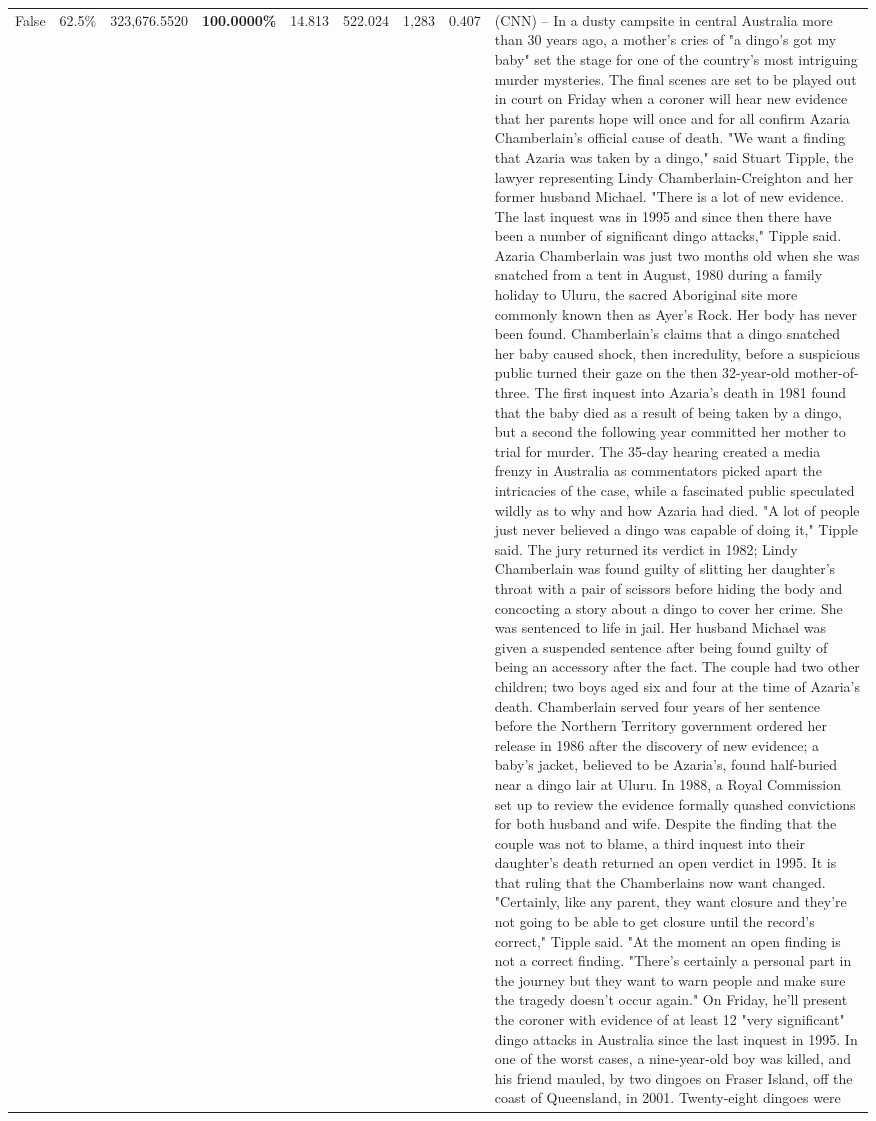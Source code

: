 \begin{table}[H]
\begin{tabular}{lllrlllll}
False & 62.5\% & 323,676.5520 & \bfseries \color{red} 100.0000\% & 14.813 & 522.024 & 1,283 & 0.407 & (CNN) -- In a dusty campsite in central Australia more than 30 years ago, a mother's cries of "a dingo's got my baby" set the stage for one of the country's most intriguing murder mysteries. The final scenes are set to be played out in court on Friday when a coroner will hear new evidence that her parents hope will once and for all confirm Azaria Chamberlain's official cause of death. "We want a finding that Azaria was taken by a dingo," said Stuart Tipple, the lawyer representing Lindy Chamberlain-Creighton and her former husband Michael. "There is a lot of new evidence. The last inquest was in 1995 and since then there have been a number of significant dingo attacks," Tipple said. Azaria Chamberlain was just two months old when she was snatched from a tent in August, 1980 during a family holiday to Uluru, the sacred Aboriginal site more commonly known then as Ayer's Rock. Her body has never been found. Chamberlain's claims that a dingo snatched her baby caused shock, then incredulity, before a suspicious public turned their gaze on the then 32-year-old mother-of-three. The first inquest into Azaria's death in 1981 found that the baby died as a result of being taken by a dingo, but a second the following year committed her mother to trial for murder. The 35-day hearing created a media frenzy in Australia as commentators picked apart the intricacies of the case, while a fascinated public speculated wildly as to why and how Azaria had died. "A lot of people just never believed a dingo was capable of doing it," Tipple said. The jury returned its verdict in 1982; Lindy Chamberlain was found guilty of slitting her daughter's throat with a pair of scissors before hiding the body and concocting a story about a dingo to cover her crime. She was sentenced to life in jail. Her husband Michael was given a suspended sentence after being found guilty of being an accessory after the fact. The couple had two other children; two boys aged six and four at the time of Azaria's death. Chamberlain served four years of her sentence before the Northern Territory government ordered her release in 1986 after the discovery of new evidence; a baby's jacket, believed to be Azaria's, found half-buried near a dingo lair at Uluru. In 1988, a Royal Commission set up to review the evidence formally quashed convictions for both husband and wife. Despite the finding that the couple was not to blame, a third inquest into their daughter's death returned an open verdict in 1995. It is that ruling that the Chamberlains now want changed. "Certainly, like any parent, they want closure and they're not going to be able to get closure until the record's correct," Tipple said. "At the moment an open finding is not a correct finding. "There's certainly a personal part in the journey but they want to warn people and make sure the tragedy doesn't occur again." On Friday, he'll present the coroner with evidence of at least 12 "very significant" dingo attacks in Australia since the last inquest in 1995. In one of the worst cases, a nine-year-old boy was killed, and his friend mauled, by two dingoes on Fraser Island, off the coast of Queensland, in 2001. Twenty-eight dingoes were 
\end{tabular}
\end{table}
